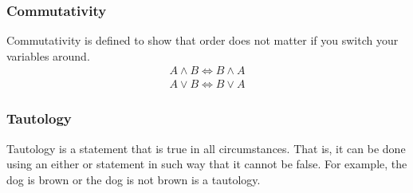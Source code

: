 \documentclass[a4paper]{article}
\theoremstyle{plain}
\theoremstyle{definition}
\newtheorem{defn}{Definition}[section]
\theoremstyle{remark}
\begin{document}
\subsubsection{Commutativity}
Commutativity is defined to show that order does not matter if you switch your variables around.
\begin{align*}
	A \land B \iff B \land A \\
	A \lor B \iff B \lor A
\end{align*}
\subsubsection{Tautology}
\begin{tcolorbox}[colback=black!3!white,colframe=black!60!white,title=\begin{defn}Tautology \label{Tautology}\end{defn}]
Tautology is a statement that is true in all circumstances. That is, it can be done using an either or statement in such way that it cannot be false. For example, the dog is brown or the dog is not brown is a tautology.
\end{tcolorbox}
\end{document}
